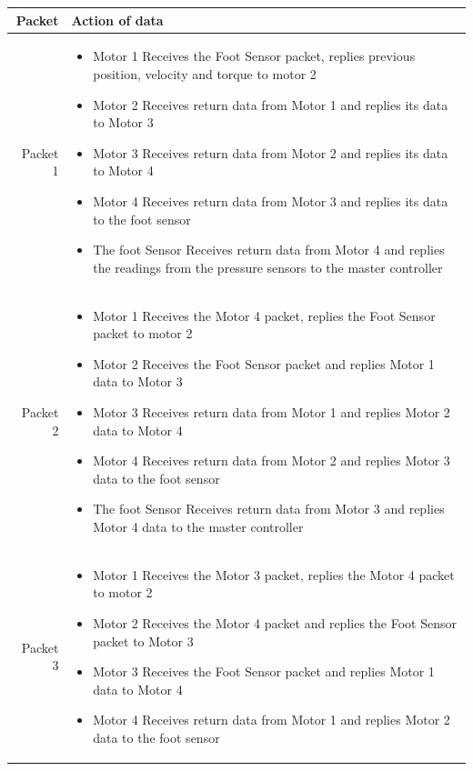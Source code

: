 \begin{longtable}{|r|p{}|}
\hline
Packet & Action of data\\
\hline
{Packet 1} &  {\begin{itemize}
                \item Motor 1 Receives the Foot Sensor packet, replies previous position, velocity and torque to motor 2
                \item Motor 2 Receives return data from Motor 1 and replies its data to Motor 3
                \item Motor 3 Receives return data from Motor 2 and replies its data to Motor 4 
                \item Motor 4 Receives return data from Motor 3 and replies its data to the foot sensor 
                \item The foot Sensor Receives return data from Motor 4 and replies the readings from the pressure sensors to the master controller
            \end{itemize}}\\
            \hline
{Packet 2} &  {\begin{itemize}
                \item Motor 1 Receives the Motor 4 packet, replies the Foot Sensor packet to motor 2
                \item Motor 2 Receives the Foot Sensor packet and replies Motor 1 data to Motor 3
                \item Motor 3 Receives return data from Motor 1 and replies Motor 2 data to Motor 4 
                \item Motor 4 Receives return data from Motor 2 and replies Motor 3 data to the foot sensor 
                \item The foot Sensor Receives return data from Motor 3 and replies Motor 4 data to the master controller
            \end{itemize}}\\
            \hline
{Packet 3} &  {\begin{itemize}
                \item Motor 1 Receives the Motor 3 packet, replies the Motor 4 packet to motor 2
                \item Motor 2 Receives the Motor 4 packet and replies the Foot Sensor packet to Motor 3
                \item Motor 3 Receives the Foot Sensor packet and replies Motor 1 data to Motor 4 
                \item Motor 4 Receives return data from Motor 1 and replies Motor 2 data to the foot sensor 

\end{itemize}}
\end{longtable}

